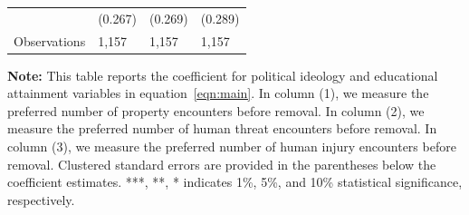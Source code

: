 \documentclass[english,12pt]{article}
\begin{document}
\begin{table}[H]
\begin{tabular}{@{}llll@{}}
            &     (0.267)   &     (0.269)   &     (0.289)   \\
        Observations & 1,157    &  1,157       & 1,157        \\\bottomrule
    \end{tabular}
    \begin{minipage}{.9\textwidth} 
            \vspace{1em}
    \footnotesize{{\bf{Note:}} This table reports the coefficient for political ideology and educational attainment variables in equation~\ref{eqn:main}. In column (1), we measure the preferred number of property encounters before removal. In column (2), we measure the preferred number of human threat encounters before removal. In column (3), we measure the preferred number of human injury encounters before removal. Clustered standard errors are provided in the parentheses below the coefficient estimates. ***, **, * indicates 1\%, 5\%, and 10\% statistical significance, respectively.}
    \label{tab: des_edu}
    \end{minipage}
\end{table}
\end{document}
